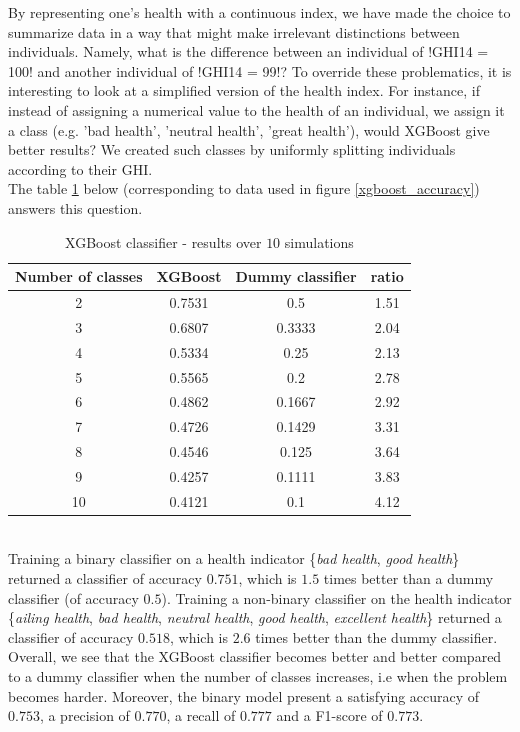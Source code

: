 \documentclass[]{article}
\begin{document}
\noindent
By representing one's health with a continuous index, we have made the choice to summarize data in a way that might make irrelevant distinctions between individuals. Namely, what is the difference between an individual of \pyth!GHI14 = 100! and another individual of \pyth!GHI14 = 99!? To override these problematics, it is interesting to look at a simplified version of the health index. For instance, if instead of assigning a numerical value to the health of an individual, we assign it a class (e.g. 'bad health', 'neutral health', 'great health'), would XGBoost give better results? We created such classes by uniformly splitting individuals according to their GHI.\\
The table \ref{results_xgbclassifier} below (corresponding to data used in figure \ref{xgboost_accuracy})  answers this question.
\begin{table}[!h]
	\centering
	\begin{tabular}{|c|c|c|c|}
		\hline
		
		\textbf{Number of classes} & \textbf{XGBoost} & \textbf{Dummy classifier} & \textbf{ratio}\\
		\hline
		2 & 0.7531 & 0.5 & 1.51\\
		\hline 
		3 & 0.6807 & 0.3333 & 2.04\\
		\hline 
		4 & 0.5334 & 0.25 & 2.13\\
		\hline 
		5 & 0.5565 & 0.2 & 2.78\\
		\hline 
		6 & 0.4862 & 0.1667 & 2.92\\
		\hline 
		7 & 0.4726 & 0.1429 & 3.31\\
		\hline 
		8 & 0.4546 & 0.125 & 3.64\\
		\hline 
		9 & 0.4257 & 0.1111 & 3.83\\
		\hline 
		10 & 0.4121 & 0.1 & 4.12\\
		\hline 
	\end{tabular}
	\caption{XGBoost classifier - results over $10$ simulations}
	\label{results_xgbclassifier}
\end{table}\\

\noindent
Training a binary classifier on a health indicator \{\textit{bad health}, \textit{good health}\}
returned a classifier of accuracy $0.751$, which is $1.5$ times better than a dummy classifier (of accuracy $0.5$). Training a non-binary classifier on the health indicator \{\textit{ailing health}, \textit{bad health}, \textit{neutral health}, \textit{good health}, \textit{excellent health}\} returned a classifier of accuracy $0.518$, which is $2.6$ times better than the dummy classifier.\\
Overall, we see that the XGBoost classifier becomes better and better compared to a dummy classifier when the number of classes increases, i.e when the problem becomes harder. Moreover, the binary model present a satisfying accuracy of $0.753$, a precision of $0.770$, a recall of $0.777$ and a F1-score of $0.773$.
\end{document}
